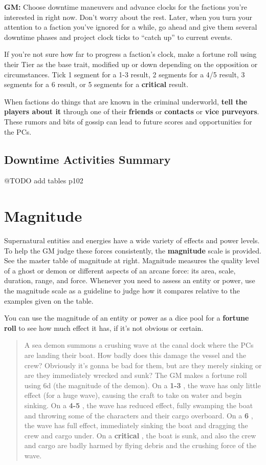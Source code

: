 \documentclass[11pt,oneside]{book}
\newcommand{\gameterm}[1]{\textbf{#1}}
\begin{document}
\textbf{GM:} Choose downtime maneuvers and advance clocks for the factions you’re interested in right now. Don’t worry about the rest. Later, when you turn your attention to a faction you’ve ignored for a while, go ahead and give them several downtime phases and project clock ticks to “catch up” to current events.

If you’re not sure how far to progress a faction’s clock, make a fortune roll using their Tier as the base trait, modified up or down depending on the opposition or circumstances. Tick 1 segment for a 1-3 result, 2 segments for a 4/5 result, 3 segments for a 6 result, or 5 segments for a \gameterm{critical}  result.

When factions do things that are known in the criminal underworld, \textbf{tell the players about it} through one of their \textbf{friends} or \textbf{contacts} or \textbf{vice purveyors}. These rumors and bits of gossip can lead to future scores and opportunities for the PCs.

\section{Downtime Activities Summary}

@TODO add tables p102

\chapter{Magnitude}

Supernatural entities and energies have a wide variety of effects and power levels. To help the GM judge these forces consistently, the \textbf{magnitude} scale is provided. See the master table of magnitude at right. Magnitude measures the quality level of a ghost or demon or different aspects of an arcane force: its area, scale, duration, range, and force. Whenever you need to assess an entity or power, use the magnitude scale as a guideline to judge how it compares relative to the examples given on the table.

You can use the magnitude of an entity or power as a dice pool for a \textbf{fortune roll} to see how much effect it has, if it’s not obvious or certain.

\begin{quote}
	A sea demon summons a crushing wave at the canal dock where the PCs are landing their boat. How badly does this damage the vessel and the crew? Obviously it’s gonna be bad for them, but are they merely sinking or are they immediately wrecked and sunk? The GM makes a fortune roll using 6d (the magnitude of the demon). On a \gameterm{1-3} , the wave has only little effect (for a huge wave), causing the craft to take on water and begin sinking. On a \gameterm{4-5} , the wave has reduced effect, fully swamping the boat and throwing some of the characters and their cargo overboard. On a \gameterm{6} , the wave has full effect, immediately sinking the boat and dragging the crew and cargo under. On a \gameterm{critical} , the boat is sunk, and also the crew and cargo are badly harmed by flying debris and the crushing force of the wave.
\end{quote} 
\end{document}
